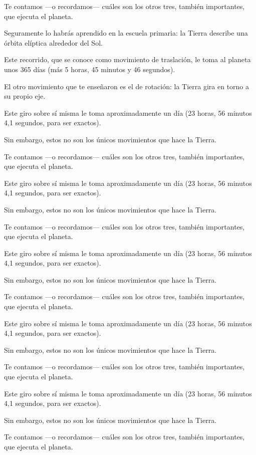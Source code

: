 Te contamos —o recordamos— cuáles son los otros tres, también importantes, que ejecuta el planeta.
	
Seguramente lo habrás aprendido en la escuela primaria: la Tierra describe una órbita elíptica alrededor del Sol.

Este recorrido, que se conoce como movimiento de traslación, le toma al planeta unos 365 días 
(más 5 horas, 45 minutos y 46 segundos).

El otro movimiento que te enseñaron es el de rotación: la Tierra gira en torno a su propio eje.

Este giro sobre sí misma le toma aproximadamente un día (23 horas, 56 minutos 4,1 segundos, para ser exactos). 

Sin embargo, estos no son los únicos movimientos que hace la Tierra.

Te contamos —o recordamos— cuáles son los otros tres, también importantes, que ejecuta el planeta.

Este giro sobre sí misma le toma aproximadamente un día (23 horas, 56 minutos 4,1 segundos, para ser exactos). 

Sin embargo, estos no son los únicos movimientos que hace la Tierra.

Te contamos —o recordamos— cuáles son los otros tres, también importantes, que ejecuta el planeta.


Este giro sobre sí misma le toma aproximadamente un día (23 horas, 56 minutos 4,1 segundos, para ser exactos). 

Sin embargo, estos no son los únicos movimientos que hace la Tierra.

Te contamos —o recordamos— cuáles son los otros tres, también importantes, que ejecuta el planeta.


Este giro sobre sí misma le toma aproximadamente un día (23 horas, 56 minutos 4,1 segundos, para ser exactos). 

Sin embargo, estos no son los únicos movimientos que hace la Tierra.

Te contamos —o recordamos— cuáles son los otros tres, también importantes, que ejecuta el planeta.

Este giro sobre sí misma le toma aproximadamente un día (23 horas, 56 minutos 4,1 segundos, para ser exactos). 

Sin embargo, estos no son los únicos movimientos que hace la Tierra.

Te contamos —o recordamos— cuáles son los otros tres, también importantes, que ejecuta el planeta.


